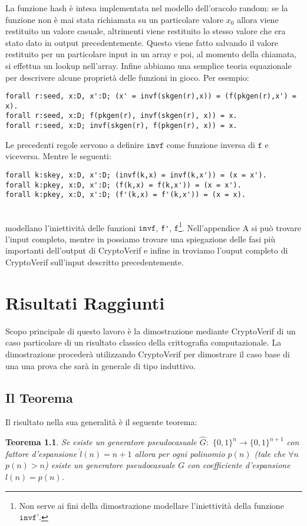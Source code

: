 \documentclass[a4paper,openright,twoside,12pt]{report}
\newtheorem{teorema}{Teorema}[chapter]
\begin{document}
La funzione hash \`e intesa implementata nel modello dell'oracolo random: se la funzione non \`e mai stata richiamata su un particolare valore $x_0$ allora viene restituito un valore casuale, 
altrimenti viene restituito lo stesso valore che era stato dato in output precedentemente. Questo viene fatto salvando il valore restituito per un particolare input in un array e poi,
al momento della chiamata, si effettua un lookup nell'array.
Infine abbiamo una semplice teoria equazionale per descrivere alcune propriet\`a delle funzioni in gioco.
Per esempio:
\begin{verbatim}
forall r:seed, x:D, x':D; (x' = invf(skgen(r),x)) = (f(pkgen(r),x') = x).
forall r:seed, x:D; f(pkgen(r), invf(skgen(r), x)) = x.
forall r:seed, x:D; invf(skgen(r), f(pkgen(r), x)) = x.
\end{verbatim}
Le precedenti regole servono a definire $\texttt{invf}$ come funzione inversa di $\texttt{f}$ e viceversa. Mentre le seguenti:
\begin{verbatim}
forall k:skey, x:D, x':D; (invf(k,x) = invf(k,x')) = (x = x').
forall k:pkey, x:D, x':D; (f(k,x) = f(k,x')) = (x = x').
forall k:pkey, x:D, x':D; (f'(k,x) = f'(k,x')) = (x = x).
\end{verbatim}\\
modellano l'iniettivit\`a delle funzioni $\texttt{invf}$, \verb!f'!, $\texttt{f}$\footnote{Non serve ai fini della dimostrazione modellare l'iniettivit\`a della funzione $\texttt{invf'}$. }.
Nell'appendice A si pu\`o trovare l'input completo, mentre in \cite{BlanchetPointchevalCrypto06} possiamo trovare una spiegazione delle fasi 
pi\`u importanti dell'output di CryptoVerif e infine in \cite{fdhall} troviamo l'ouput completo di CryptoVerif sull'input descritto precedentemente.

\chapter{Risultati Raggiunti}
Scopo principale di questo lavoro \`e la dimostrazione mediante CryptoVerif di un caso particolare di un risultato classico della crittografia computazionale. 
La dimostrazione proceder\`a utilizzando CryptoVerif per dimostrare il caso base 
di una una prova che sar\`a in generale di tipo induttivo.
\section{Il Teorema}
Il risultato nella sua generalit\`a \`e il seguente teorema:
\begin{teorema}
Se esiste un generatore pseudocasuale $\hat{G}:$ $\{0, 1\}^n \rightarrow \{0, 1\}^{n+1}$ con fattore 
d'espansione $\hat{l}(n)=n+1$ allora per ogni polinomio $p(n)$ (tale che $\forall n$ $p(n)>n$)
esiste un generatore pseudocasuale $G$ con coefficiente d'espansione $l(n)=p(n)$.
\end{teorema}
\end{document}
